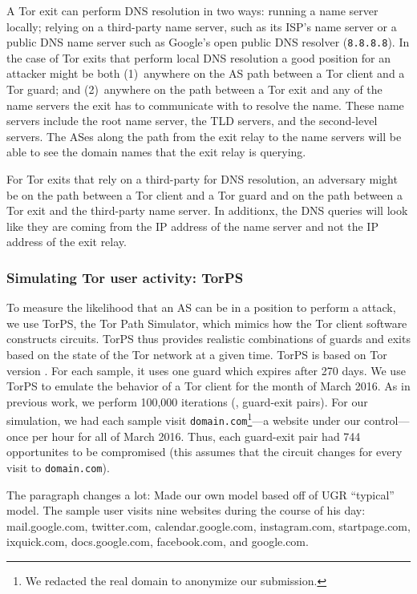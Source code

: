 A Tor exit can perform DNS resolution in two ways: running a name server
locally; relying on a third-party name server, such as its ISP's name
server or a public DNS name server such as Google's open public DNS
resolver ({\tt 8.8.8.8}).  In the case of Tor
exits that perform local DNS resolution a good position for an attacker
might be both (1)~anywhere on the AS path between a Tor client and a Tor
guard; and (2)~anywhere on the path between a Tor exit and any of the
name servers the exit has to communicate with to resolve the name.
These name servers include the root name server, the TLD servers, and
the second-level servers.  The ASes along the path from the exit relay
to the name servers will be able to see the domain names that the exit
relay is querying.

For Tor exits that rely on a third-party for DNS resolution, an
adversary might be on the path between a Tor client and a
Tor guard and on the path between a Tor exit and the third-party name
server.  In additionx, the DNS queries will look like they are coming
from the IP address of the name server and not the IP address of the
exit relay.

\subsubsection{Simulating Tor user activity: TorPS}

To measure the likelihood that an AS can be in a position to perform a
\name attack, we use TorPS, the Tor Path Simulator, which
mimics how the Tor client software constructs circuits.
TorPS thus provides realistic combinations of guards and exits based on the state of the 
Tor network at a given time. TorPS is based on Tor version . For each sample, it uses 
one guard which expires after 270 days. We use TorPS to emulate the behavior of a Tor 
client for the month of March 2016.  As in previous work, we perform
100,000 iterations (\ie, guard-exit pairs).
 For our simulation, we had each sample 
visit {\tt domain.com}\footnote{We redacted the real domain to anonymize our
submission.}---a website under our control---once per hour for all
of March 2016.  Thus, each guard-exit pair had 744 opportunites to be
compromised (this assumes that the circuit changes for every visit to
{\tt domain.com}). 

The paragraph changes a lot: Made our own model based off of UGR ``typical'' model.  
The sample user visits nine websites during the course of his day: mail.google.com, 
twitter.com, calendar.google.com, instagram.com, startpage.com, ixquick.com, docs.google.com, 
facebook.com, and google.com.  

